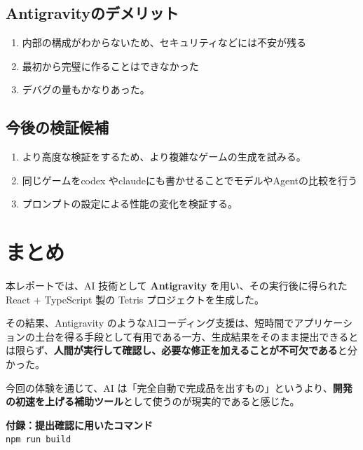 \documentclass[a4paper,11pt,ja=standard,lualatex]{bxjsarticle}
\begin{document}
\subsection{Antigravityのデメリット}
\begin{enumerate}[leftmargin=6mm]
  \item 内部の構成がわからないため、セキュリティなどには不安が残る
  \item 最初から完璧に作ることはできなかった
  \item デバグの量もかなりあった。
\end{enumerate}

\subsection{今後の検証候補}
\begin{enumerate}[leftmargin=6mm]
  \item より高度な検証をするため、より複雑なゲームの生成を試みる。
  \item 同じゲームをcodex やclaudeにも書かせることでモデルやAgentの比較を行う
  \item プロンプトの設定による性能の変化を検証する。
\end{enumerate}


\section{まとめ}
本レポートでは、AI 技術として \textbf{Antigravity} を用い、その実行後に得られた React + TypeScript 製の Tetris プロジェクトを生成した。

その結果、Antigravity のようなAIコーディング支援は、短時間でアプリケーションの土台を得る手段として有用である一方、生成結果をそのまま提出できるとは限らず、\textbf{人間が実行して確認し、必要な修正を加えることが不可欠である}と分かった。

今回の体験を通じて、AI は「完全自動で完成品を出すもの」というより、\textbf{開発の初速を上げる補助ツール}として使うのが現実的であると感じた。


\vfill
\noindent\textbf{付録：提出確認に用いたコマンド}\\
\texttt{npm run build}
\end{document}
